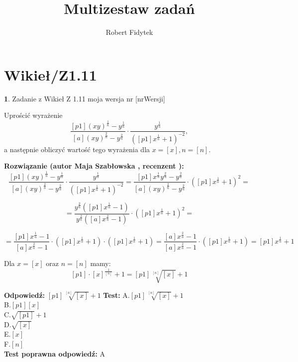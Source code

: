 \documentclass[12pt, a4paper]{article}
\title{Multizestaw zadań}
\author{Robert Fidytek}
\date{}
\theoremstyle{definition} %
\newtheorem{zad}{}
\newcommand{\kategoria}[1]{\section{#1}} %
\newcommand{\zadStart}[1]{\begin{zad}#1\newline} %
\newcommand{\zadStop}{\end{zad}}   %
\newcommand{\rozwStart}[2]{\noindent \textbf{Rozwiązanie (autor #1 , recenzent #2): }\newline} %
\newcommand{\rozwStop}{\newline}                                            %
\newcommand{\odpStart}{\noindent \textbf{Odpowiedź:}\newline}    %
\newcommand{\odpStop}{\newline}                                             %
\newcommand{\testStart}{\noindent \textbf{Test:}\newline} %
\newcommand{\testStop}{\newline} %
\newcommand{\kluczStart}{\noindent \textbf{Test poprawna odpowiedź:}\newline} %
\newcommand{\kluczStop}{\newline} %
\begin{document}
\maketitle


\kategoria{Wikieł/Z1.11}
\zadStart{Zadanie z Wikieł Z 1.11 moja wersja nr [nrWersji]}



Uprościć wyrażenie $$\frac{[p1](xy)^{\frac{1}{n}}-y^{\frac{1}{n}}}{[a](xy)^{\frac{2}{n}}-y^{\frac{2}{n}}}\cdot \frac{y^{\frac{1}{n}}}{\left([p1]x^{\frac{1}{n}}+1\right)^{-2}},$$
a następnie obliczyć wartość tego wyrażenia dla $x=[x], n=[n].$
\zadStop

\rozwStart{Maja Szabłowska}{}
$$\frac{[p1](xy)^{\frac{1}{n}}-y^{\frac{1}{n}}}{[a](xy)^{\frac{2}{n}}-y^{\frac{2}{n}}}\cdot \frac{y^{\frac{1}{n}}}{\left([p1]x^{\frac{1}{n}}+1\right)^{-2}}=\frac{[p1]x^{\frac{1}{n}}y^{\frac{2}{n}}-y^{\frac{2}{n}}}{[a](xy)^{\frac{2}{n}}-y^{\frac{2}{n}}}\cdot\left([p1]x^{\frac{1}{n}}+1\right)^{2}=$$

$$=\frac{y^{\frac{2}{n}}([p1]x^{\frac{1}{n}}-1)}{y^{\frac{2}{n}}([a]x^{\frac{2}{n}}-1)}\cdot \left([p1]x^{\frac{1}{n}}+1\right)^{2}=$$

$$=\frac{[p1]x^{\frac{1}{n}}-1}{[a]x^{\frac{2}{n}}-1}\cdot \left([p1]x^{\frac{1}{n}}+1\right) \cdot \left([p1]x^{\frac{1}{n}}+1\right)= \frac{[a]x^{\frac{2}{n}}-1}{[a]x^{\frac{2}{n}}-1}\cdot\left([p1]x^{\frac{1}{n}}+1\right)=[p1]x^{\frac{1}{n}}+1$$

Dla $x=[x]$ oraz $n=[n]$ mamy:
$$[p1]\cdot[x]^{\frac{1}{[n]}}+1=[p1]\sqrt[[n]]{[x]}+1$$
\rozwStop


\odpStart
$[p1]\sqrt[[n]]{[x]}+1$
\odpStop
\testStart
A.$[p1]\sqrt[[n]]{[x]}+1$\\
B.$[p1][x]$\\
C.$\sqrt{[p1]}+1$\\
D.$\sqrt{[x]}$\\
E.$[x]$\\
F.$[n]$\\
\testStop
\kluczStart
A
\kluczStop
\end{document}
